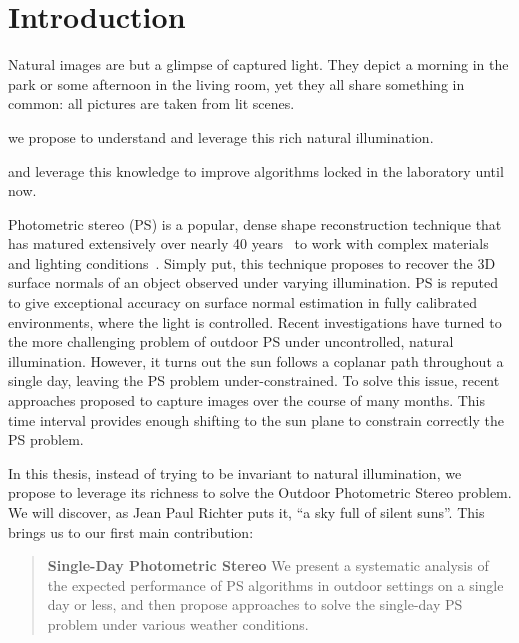 \chapter*{Introduction}         %

Natural images are but a glimpse of captured light. They depict a morning in the park or some afternoon in the living room, yet they all share something in common: all pictures are taken from lit scenes.


we propose to understand and leverage this rich natural illumination.

and leverage this knowledge to improve algorithms locked in the laboratory until now.

Photometric stereo (PS) is a popular, dense shape reconstruction technique that has matured extensively over nearly 40 years~\cite{woodham-opteng-80} to work with complex materials and lighting conditions~\cite{alldrin-cvpr-08,basri-ijcv-07,johnson-cvpr-11,oxholm-eccv-12}.
Simply put, this technique proposes to recover the 3D surface normals of an object observed under varying illumination.
PS is reputed to give exceptional accuracy on surface normal estimation in fully calibrated environments, where the light is controlled.
Recent investigations have turned to the more challenging problem of outdoor PS under uncontrolled, natural illumination. However, it turns out the sun follows a coplanar path throughout a single day, leaving the PS problem under-constrained. To solve this issue, recent approaches proposed to capture images over the course of many months\cite{ackermann-cvpr-12,abrams-eccv-12}. This time interval provides enough shifting to the sun plane to constrain correctly the PS problem.

In this thesis, instead of trying to be invariant to natural illumination, we propose to leverage its richness to solve the Outdoor Photometric Stereo problem. We will discover, as Jean Paul Richter puts it, ``a sky full of silent suns''. This brings us to our first main contribution:
\begin{quotation}
\textbf{Single-Day Photometric Stereo} We present a systematic analysis of the expected performance of PS algorithms in outdoor settings on a single day or less, and then propose approaches to solve the single-day PS problem under various weather conditions.
\end{quotation}

